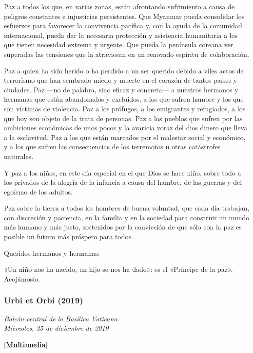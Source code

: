 Paz a todos los que, en varias zonas, están afrontando sufrimiento a
causa de peligros constantes e injusticias persistentes. Que Myanmar
pueda consolidar los esfuerzos para favorecer la convivencia pacífica y,
con la ayuda de la comunidad internacional, pueda dar la necesaria
protección y asistencia humanitaria a los que tienen necesidad extrema y
urgente. Que pueda la península coreana ver superadas las tensiones que
la atraviesan en un renovado espíritu de colaboración.

Paz a quien ha sido herido o ha perdido a un ser querido debido a viles
actos de terrorismo que han sembrado miedo y muerte en el corazón de
tantos países y ciudades. Paz ---no de palabra, sino eficaz y
concreta--- a nuestros hermanos y hermanas que están abandonados y
excluidos, a los que sufren hambre y los que son víctimas de violencia.
Paz a los prófugos, a los emigrantes y refugiados, a los que hoy son
objeto de la trata de personas. Paz a los pueblos que sufren por las
ambiciones económicas de unos pocos y la avaricia voraz del dios dinero
que lleva a la esclavitud. Paz a los que están marcados por el malestar
social y económico, y a los que sufren las consecuencias de los
terremotos u otras catástrofes naturales.

Y paz a los niños, en este día especial en el que Dios se hace niño,
sobre todo a los privados de la alegría de la infancia a causa del
hambre, de las guerras y del egoísmo de los adultos.

Paz sobre la tierra a todos los hombres de buena voluntad, que cada día
trabajan, con discreción y paciencia, en la familia y en la sociedad
para construir un mundo más humano y más justo, sostenidos por la
convicción de que sólo con la paz es posible un futuro más próspero para
todos.

Queridos hermanos y hermanas:

«Un niño nos ha nacido, un hijo se nos ha dado»: es el «Príncipe de la
paz». Acojámoslo.

\subsubsection{Urbi et Orbi (2019)}
\emph{Balcón central de la Basílica Vaticana\\
	Miércoles, 25 de diciembre de 2019}

{[}\textbf{\href{http://w2.vatican.va/content/francesco/es/events/event.dir.html/content/vaticanevents/es/2019/12/25/urbi-et-orbi.html}{Multimedia}}{]}

